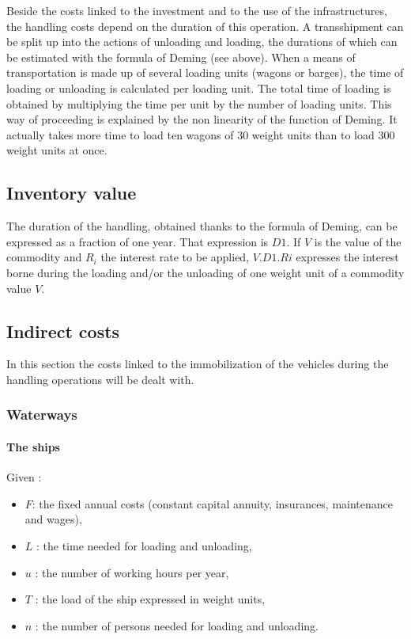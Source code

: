 Beside the costs linked to the investment and to the use of the infrastructures,
the handling costs depend on the duration of this operation.  A transshipment
can be split up into the actions of unloading and loading, the durations of
which can be estimated with the formula of Deming (see above).  When a means of
transportation is made up of several loading units (wagons or barges), the time
of loading or unloading is calculated per loading unit.  The total time of
loading is obtained by multiplying the time per unit by the number of loading
units.  This way of proceeding is explained by the non linearity of the function
of Deming.  It actually takes more time to load ten wagons of 30 weight units than to
load 300 weight units at once.



\subsection{Inventory value}

The duration of the handling, obtained thanks to the formula of Deming, can be
expressed as a fraction of one year.  That expression is $D1$.  If $V$ is the value of the
commodity and $R_i$ the interest rate to be applied, $V.D1.Ri$ expresses the
interest borne during the loading and/or the unloading of one weight unit of a commodity
value $V$.


\subsection{Indirect costs}

In this section the costs linked to the immobilization of the vehicles during
the handling operations will be dealt with.

\subsubsection{Waterways}

\paragraph{The ships}

Given :

\begin{itemize}
\item $F$: the fixed annual costs (constant capital annuity, insurances,
maintenance and wages),
\item $L$ : the time needed for loading and unloading,
\item $u$ : the number of working hours per year,
\item $T$ : the load of the ship expressed in weight units,
\item $n$ : the number of persons needed for loading and unloading.
\end{itemize}



